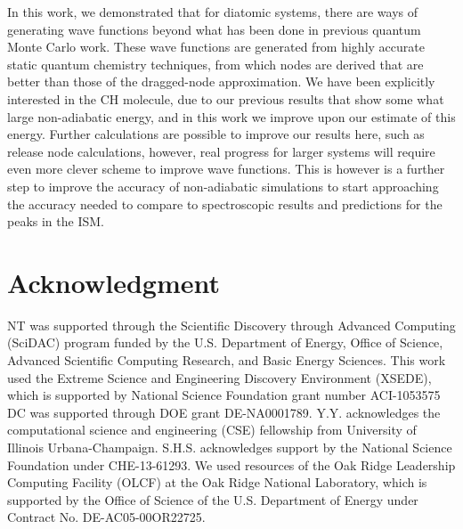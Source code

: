 \documentclass[aip,jcp,numerical,reprint]{revtex4-1}
\begin{document}
In this work, we demonstrated that for diatomic systems, there are ways of generating wave functions beyond what has been done in previous quantum Monte Carlo work.  These wave functions are generated from highly accurate static quantum chemistry techniques, from which nodes are derived that are better than those of the dragged-node approximation.  We have been explicitly interested in the CH molecule, due to our previous results that show some what large non-adiabatic energy, and in this work we improve upon our estimate of this energy.  Further calculations are possible to improve our results here, such as release node calculations, however, real progress for larger systems will require even more clever scheme to improve wave functions.   This is however is a further step to improve the accuracy of non-adiabatic simulations to start approaching the accuracy needed to compare to spectroscopic results and predictions for the peaks in the ISM.


\section{Acknowledgment}
NT was supported through the Scientific Discovery through Advanced Computing (SciDAC) program funded by the U.S. Department of Energy, Office of Science, Advanced Scientific Computing
Research, and Basic Energy Sciences.  This work used the Extreme Science and Engineering Discovery Environment (XSEDE), which is supported by National Science Foundation grant number ACI-1053575
 DC was supported through  DOE grant DE-NA0001789. Y.Y. acknowledges the computational science and engineering (CSE) fellowship from University of Illinois Urbana-Champaign. S.H.S. acknowledges support by the National Science Foundation under CHE-13-61293. We used resources of the Oak Ridge Leadership Computing Facility (OLCF) at the Oak Ridge National Laboratory, which is supported by the Office of Science of the U.S. Department of Energy under Contract No. DE-AC05-00OR22725.


\end{document}
